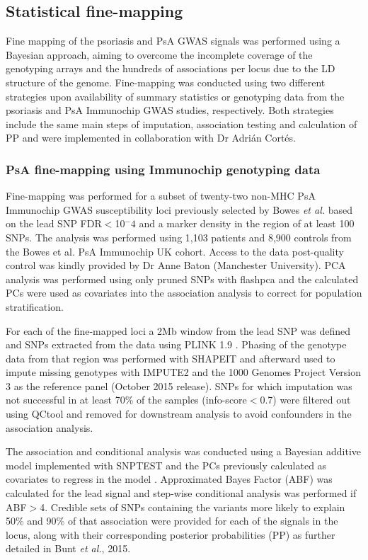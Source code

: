 \subsection{Statistical fine-mapping}


Fine mapping of the psoriasis and PsA GWAS signals was performed using a Bayesian approach, aiming to overcome the incomplete coverage of the genotyping arrays and the hundreds of associations per locus due to the LD structure of the genome. Fine-mapping was conducted using two different strategies upon availability of summary statistics or genotyping data from the psoriasis and PsA Immunochip GWAS studies, respectively. Both strategies include the same main steps of imputation, association testing and calculation of PP and were implemented in collaboration with Dr Adri\'{a}n Cort\'{e}s.

\subsubsection{PsA fine-mapping using Immunochip genotyping data}
Fine-mapping was performed for a subset of twenty-two non-MHC PsA Immunochip GWAS susceptibility loci previously selected by Bowes \textit{et al.} based on the lead SNP FDR$<$10$^-4$ and a marker density in the region of at least 100 SNPs.  The analysis was performed using 1,103 patients and 8,900 controls from the Bowes {et al.} PsA Immunochip UK cohort. Access to the data post-quality control was kindly provided by Dr Anne Baton (Manchester University). PCA analysis was performed using only pruned SNPs with flashpca \parencite{Abraham2014} and the calculated PCs were used as covariates into the association analysis to correct for population stratification. 

For each of the fine-mapped loci a 2Mb window from the lead SNP was defined and SNPs extracted from the data using PLINK 1.9 \parencite{Chang2015}. Phasing of the genotype data from that region was performed with SHAPEIT \parencite{Delaneau2012} and afterward used to impute missing genotypes with IMPUTE2 \parencite{Howie2009} and the 1000 Genomes Project Version 3 as the reference panel (October 2015 release). SNPs for which imputation was not successful in at least 70\% of the samples (info-score$<$0.7) were filtered out using QCtool and removed for downstream analysis to avoid confounders in the association analysis.

The association and conditional analysis was conducted using a Bayesian additive model implemented with SNPTEST and the PCs previously calculated as covariates to regress in the model \parencite{Burton2007}. Approximated Bayes Factor (ABF) was calculated for the lead signal and step-wise conditional analysis was performed if ABF$>$4. Credible sets of SNPs containing the variants more likely to explain 50\% and 90\% of that association were provided for each of the signals in the locus, along with their corresponding posterior probabilities (PP) as further detailed in Bunt \textit{et al.}, 2015.



